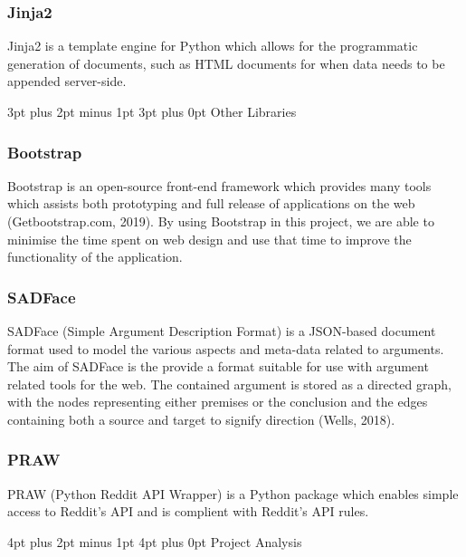 \documentclass[12pt,a4paper]{article}
\makeatletter
\renewcommand\subsection{\@startsection {subsection}{1}{2mm} %
                               {3pt plus 2pt minus 1pt} %
                               {3pt plus 0pt} %
                               {\normalfont\bfseries}}
\renewcommand\section{\@startsection {section}{1}{0mm} %
                               {4pt plus 2pt minus 1pt} %
                               {4pt plus 0pt} %
                               {\bfseries}}
\makeatother
\begin{document}
\subsubsection{Jinja2}

Jinja2 is a template engine for Python which allows for the programmatic generation of documents, such as HTML documents for when data needs to be appended server-side.

\subsection{Other Libraries}

\subsubsection{Bootstrap}

Bootstrap is an open-source front-end framework which provides many tools which assists both prototyping and full release of applications on the web (Getbootstrap.com, 2019). By using Bootstrap in this project, we are able to minimise the time spent on web design and use that time to improve the functionality of the application.

\subsubsection{SADFace}

SADFace (Simple Argument Description Format) is a JSON-based document format used to model the various aspects and meta-data related to arguments. The aim of SADFace is the provide a format suitable for use with argument related tools for the web. The contained argument is stored as a directed graph, with the nodes representing either premises or the conclusion and the edges containing both a source and target to signify direction (Wells, 2018).

\subsubsection{PRAW}

PRAW (Python Reddit API Wrapper) is a Python package which enables simple access to Reddit's API and is complient with Reddit's API rules.


\newpage
\section{Project Analysis}
\end{document}
